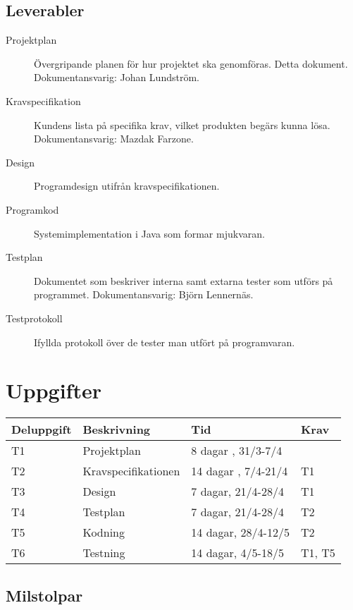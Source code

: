 \documentclass[a4paper]{article}
\begin{document}
\subsection{Leverabler} %

\begin{description}
 \item[Projektplan] Övergripande planen för hur projektet ska genomföras. Detta dokument. Dokumentansvarig: Johan Lundström.

 \item[Kravspecifikation] Kundens lista på specifika krav, vilket produkten begärs kunna lösa. Dokumentansvarig: Mazdak Farzone.

 \item[Design] Programdesign utifrån kravspecifikationen.
 
 \item[Programkod] Systemimplementation i Java som formar mjukvaran.

 \item[Testplan] Dokumentet som beskriver interna samt extarna tester som utförs på programmet. Dokumentansvarig: Björn Lennernäs.

 \item[Testprotokoll] Ifyllda protokoll över de tester man utfört på programvaran.
\end{description}

\section{Uppgifter}

\begin{tabular}{l|l|l|l}
\textbf{Deluppgift}		&	\textbf{Beskrivning}		&   \textbf{Tid}		&	\textbf{Krav} \\
\hline
T1 		&	Projektplan		&	8 dagar , 31/3-7/4		&	\\	
T2 		&	Kravspecifikationen		&	14 dagar , 7/4-21/4  	&	T1 \\
T3 		&	Design		&	7 dagar, 21/4-28/4		&	 T1 \\	
T4 		&	Testplan		&	7 dagar, 21/4-28/4		& 	T2 \\	
T5 		&	Kodning	  	&	14 dagar, 28/4-12/5	&	 T2 \\	
T6 		&	Testning		&	14 dagar, 4/5-18/5 	&	 T1, T5 \\	
\end{tabular}

\subsection{Milstolpar} %
\end{document}
